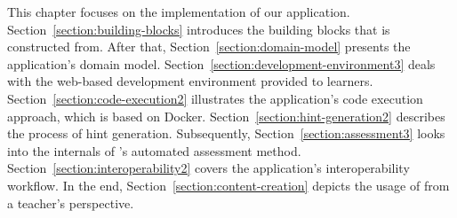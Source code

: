 This chapter focuses on the implementation of our application. Section~\ref{section:building-blocks} introduces the building blocks that \tool is constructed from. After that, Section~\ref{section:domain-model} presents the application's domain model. Section~\ref{section:development-environment3} deals with the web-based development environment provided to learners. Section~\ref{section:code-execution2} illustrates the application's code execution approach, which is based on Docker. Section~\ref{section:hint-generation2} describes the process of hint generation. Subsequently, Section~\ref{section:assessment3} looks into the internals of \tool's automated assessment method. Section~\ref{section:interoperability2} covers the application's interoperability workflow. In the end, Section~\ref{section:content-creation} depicts the usage of \tool from a teacher's perspective.
